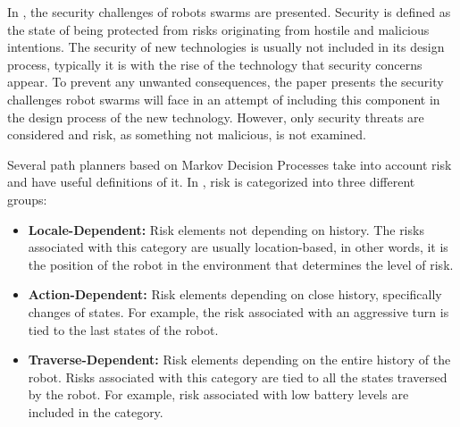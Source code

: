 In \cite{higgins2009threats}, the security challenges of robots swarms are presented. Security is defined as the state of being protected from risks originating from hostile and malicious intentions. The security of new technologies is usually not included in its design process, typically it is with the rise of the technology that security concerns appear. To prevent any unwanted consequences, the paper presents the security challenges robot swarms will face in an attempt of including this component in the design process of the new technology. However, only security threats are considered and risk, as something not malicious, is not examined.

Several path planners based on Markov Decision Processes \cite{undurti2010online,thiebaux2016rao,xiao2020robot} take into account risk and have useful definitions of it. In \cite{xiao2020robot}, risk is categorized into three different groups:

\begin{itemize}
    \item \textbf{Locale-Dependent:} Risk elements not depending on history. The risks associated with this category are usually location-based, in other words, it is the position of the robot in the environment that determines the level of risk. 
    \item \textbf{Action-Dependent:} Risk elements depending on close history, specifically changes of states. For example, the risk associated with an aggressive turn is tied to the last states of the robot.   
    \item \textbf{Traverse-Dependent:} Risk elements depending on the entire history of the robot. Risks associated with this category are tied to all the states traversed by the robot. For example, risk associated with low battery levels are included in the category.  
\end{itemize}

